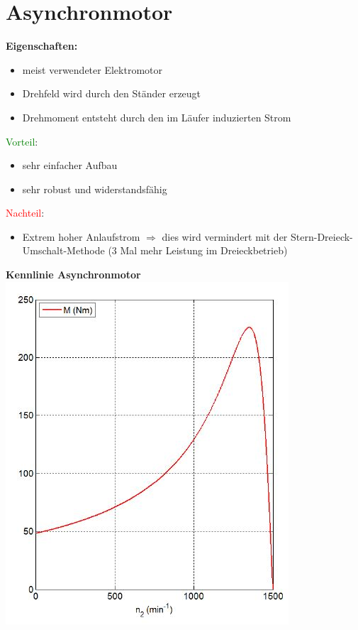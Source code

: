 \section{Asynchronmotor}
\begin{minipage}{0.6\linewidth}
\textbf{Eigenschaften:}
\begin{itemize}
    \item meist verwendeter Elektromotor
    \item Drehfeld wird durch den Ständer erzeugt
    \item Drehmoment entsteht durch den im Läufer induzierten Strom
\end{itemize}
\textcolor{green}{Vorteil}:
\begin{itemize}
	\item sehr einfacher Aufbau
	\item sehr robust und widerstandsfähig 
\end{itemize}
\textcolor{red}{Nachteil}:
\begin{itemize}
	\item Extrem hoher Anlaufstrom \newline
		$\Rightarrow$ dies wird vermindert mit der Stern-Dreieck-Umschalt-Methode \newline
        (3 Mal mehr Leistung im Dreieckbetrieb)
\end{itemize}
\end{minipage}
\begin{minipage}{0.4\linewidth}
\textbf{Kennlinie Asynchronmotor}\newline
\includegraphics[scale = 0.6]{images/KennlinieASM}
\end{minipage}
